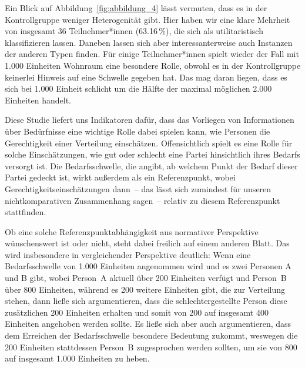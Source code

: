 \documentclass[justified,nobib,nohyper,symmetric,twoside]{tufte-book}
\begin{document}
Ein Blick auf Abbildung~\ref{fig:abbildung_4} lässt vermuten, dass es in der Kontrollgruppe weniger Heterogenität gibt.
Hier haben wir eine klare Mehrheit von insgesamt 36 Teilnehmer*innen (63.16\,\%), die sich als utilitaristisch klassifizieren lassen.
Daneben lassen sich aber interessanterweise auch Instanzen der anderen Typen finden.
Für einige Teilnehmer*innen spielt wieder der Fall mit 1.000 Einheiten Wohnraum eine besondere Rolle, obwohl es in der Kontrollgruppe keinerlei Hinweis auf eine \mbox{Schwelle} gegeben hat.
Das mag daran liegen, dass es sich bei 1.000 Einheit schlicht um die Hälfte der maximal möglichen 2.000 Einheiten handelt.

Diese Studie liefert uns Indikatoren dafür, dass das Vorliegen von Informationen über Bedürfnisse eine wichtige Rolle dabei spielen kann, wie Personen die Gerechtigkeit einer Verteilung einschätzen.
Offensichtlich spielt es eine Rolle für solche Einschätzungen, wie gut oder schlecht eine Partei hinsichtlich ihres Bedarfs versorgt ist.
Die \mbox{Bedarfsschwelle}, die angibt, ab welchem Punkt der Bedarf dieser Partei gedeckt ist, wirkt außerdem als ein Referenzpunkt, wobei Gerechtigkeitseinschätzungen dann~-- das lässt sich zumindest für unseren nichtkomparativen Zusammenhang sagen~-- relativ zu diesem Referenzpunkt stattfinden.

Ob eine solche Referenzpunktabhängigkeit aus normativer Perspektive wünschenswert ist oder nicht, steht dabei freilich auf einem anderen Blatt.
Das wird insbesondere in vergleichender Perspektive deutlich: Wenn eine Bedarfsschwelle von 1.000 Einheiten angenommen wird und es zwei Personen A und B gibt, wobei Person~A aktuell über 200 Einheiten verfügt und Person~B über 800 Einheiten, während es 200 weitere Einheiten gibt, die zur Verteilung stehen, dann ließe sich argumentieren, dass die schlechtergestellte Person diese zusätzlichen 200 Einheiten erhalten und somit von 200 auf insgesamt 400 Einheiten angehoben werden sollte.
Es ließe sich aber auch argumentieren, dass dem Erreichen der Bedarfsschwelle besondere Bedeutung zukommt, weswegen die 200 Einheiten stattdessen Person~B zugesprochen werden sollten, um sie von 800 auf insgesamt 1.000 Einheiten zu heben.


\end{document}
